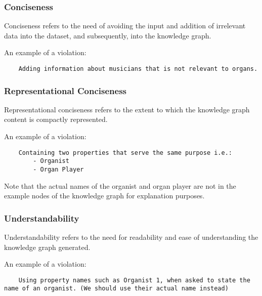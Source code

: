 \subsubsection{Conciseness}
\hspace{0.5cm} Conciseness refers to the need of avoiding the input and addition of irrelevant data into the dataset, and subsequently, into the knowledge graph. \cite{knowledgegraphevaulationbook}

An example of a violation: 
\begin{lstlisting}
    Adding information about musicians that is not relevant to organs.
\end{lstlisting}

\subsubsection{Representational Conciseness}
\hspace{0.5cm} Representational conciseness refers to the extent to which the knowledge graph content is compactly represented. \cite{knowledgegraphevaulationbook}

An example of a violation: 
\begin{lstlisting}
    Containing two properties that serve the same purpose i.e.:
        - Organist
        - Organ Player
\end{lstlisting}
\begin{center}
\end{center}

Note that the actual names of the organist and organ player are not in the example nodes of the knowledge graph for explanation purposes. 

\subsubsection{Understandability}
\hspace{0.5cm} Understandability refers to the need for readability and ease of understanding the knowledge graph generated. \cite{knowledgegraphevaulationbook}

An example of a violation: 
\begin{lstlisting}
    Using property names such as Organist 1, when asked to state the name of an organist. (We should use their actual name instead)
\end{lstlisting}
\begin{center}
\end{center}
